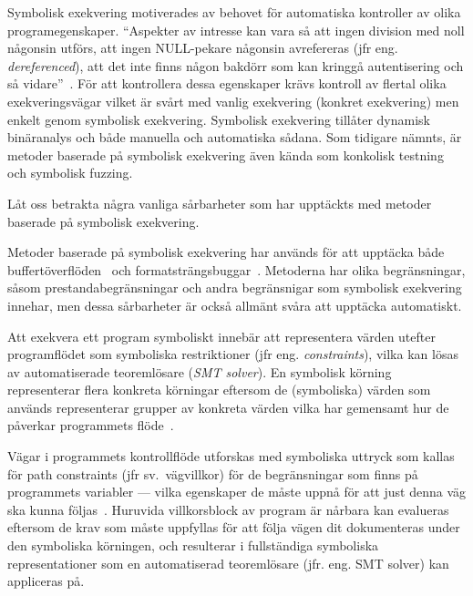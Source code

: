 


Symbolisk exekvering motiverades av behovet för automatiska kontroller av olika
programegenskaper. ``Aspekter av intresse kan vara så att ingen division med
noll någonsin utförs, att ingen NULL-pekare någonsin avrefereras (jfr eng.
\emph{dereferenced}), att det inte finns någon bakdörr som kan kringgå
autentisering och så vidare''~\cite{survey_symb_exc}. För att kontrollera dessa
egenskaper krävs kontroll av flertal olika exekveringsvägar vilket är svårt med
vanlig exekvering (konkret exekvering) men enkelt genom symbolisk exekvering.
Symbolisk exekvering tillåter dynamisk binäranalys och både manuella och
automatiska sådana. Som tidigare nämnts, är metoder baserade på symbolisk
exekvering även kända som konkolisk testning och symbolisk fuzzing.

Låt oss betrakta några vanliga sårbarheter som har upptäckts med metoder
baserade på symbolisk exekvering.

Metoder baserade på symbolisk exekvering har används för att upptäcka både
buffertöverflöden~\cite{bofaeg} och formatsträngsbuggar~\cite{vakkaupad15}.
Metoderna har olika begränsningar, såsom prestandabegränsningar och andra
begränsnigar som symbolisk exekvering innehar, men dessa sårbarheter är också
allmänt svåra att upptäcka automatiskt.


Att exekvera ett program symboliskt innebär att representera värden utefter
programflödet som symboliska restriktioner (jfr eng. \emph{constraints}), vilka kan
lösas av automatiserade teoremlösare (\emph{SMT solver}). En symbolisk körning
representerar flera konkreta körningar eftersom de (symboliska) värden som
används representerar grupper av konkreta värden vilka har gemensamt hur de
påverkar programmets flöde~\cite{klee}.

Vägar i programmets kontrollflöde utforskas med symboliska uttryck som kallas
för path constraints (jfr sv.\ vägvillkor) för de begränsningar som finns på
programmets variabler --- vilka egenskaper de måste uppnå för att just denna väg
ska kunna följas~\cite{klee}. Huruvida villkorsblock av program är nårbara kan
evalueras eftersom de krav som måste uppfyllas för att följa vägen dit dokumenteras
under den symboliska körningen, och resulterar i fullständiga symboliska representationer
som en automatiserad teoremlösare (jfr. eng. SMT solver) kan appliceras på.

